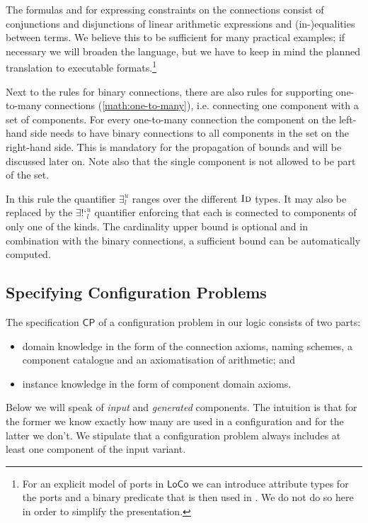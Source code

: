 \documentclass[copyright,creativecommons]{eptcs}
\newcommand{\LoCo}{\ensuremath{\mathsf{LoCo}}\xspace}
\newcommand{\confprob}{\ensuremath{\mathsf{CP}}\xspace}
\newcommand{\sort}[1]{\ensuremath{\text{\sc #1}}\xspace}
\newcommand{\cex}{\ensuremath{\exists^{u}_{l}}\xspace}
\newcommand{\xcex}{\ensuremath{\exists \text{!`}^{u}_{l}}\xspace}
\begin{document}
The formulas  and  for expressing constraints on the connections consist of conjunctions and disjunctions of linear arithmetic expressions and (in-)equalities between terms.
We believe this to be sufficient for many practical examples; if necessary we will broaden the language, but we have to keep in mind the planned translation to executable formats.\footnote{For an explicit model of ports in \LoCo we can introduce attribute types for the ports and a binary predicate  that is then used in . We do not do so here in order to simplify the presentation.}

Next to the rules for binary connections, there are also rules for supporting one-to-many connections (\ref{math:one-to-many}), 
i.e. connecting one component with a set of components. 
For every one-to-many connection the component on the left-hand side needs to have binary connections to all components in the set on the right-hand side. This is mandatory for the propagation of bounds and will be discussed later on. 
Note also that the single component is not allowed to be part of the set. 



In this rule the quantifier \cex ranges over the  different \sort{Id} types. 
It may also be replaced by the \xcex quantifier enforcing that each  is connected to components of only one of the  kinds. 
The cardinality upper bound is optional and in combination with the binary connections, a sufficient bound can be automatically computed. 

\subsection{Specifying Configuration Problems}
\label{sec:cp}

The specification \confprob of a configuration problem in our logic consists of two parts\/:

\begin{itemize}
\item domain knowledge in the form of the connection axioms, naming schemes, a component catalogue and an axiomatisation of arithmetic; and
\item instance knowledge in the form of component domain axioms.
\end{itemize}

Below we will speak of {\em input} and {\em generated} components. The intuition is that for the former we know exactly how many are used in a configuration and for the latter we don't.
We stipulate that a configuration problem always includes at least one component of the input variant. 
\end{document}
